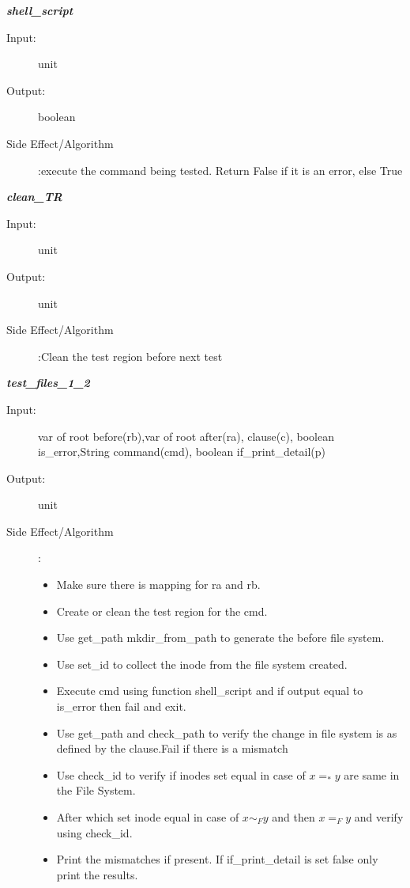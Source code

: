 \documentclass[12pt]{article}
\begin{document}
\begin{description}
\item \textbf{\textit{shell\_script}}
\begin{description}
    \item[Input:] unit
    \item[Output:] boolean
    \item[Side Effect/Algorithm]:execute the command being tested. Return False if it is an error, else True
\end{description}

\item \textbf{\textit{clean\_TR}}
\begin{description}
    \item[Input:] unit
    \item[Output:] unit
    \item[Side Effect/Algorithm]:Clean the test region before next test
\end{description}

\item \textbf{\textit{test\_files\_1\_2}}
\begin{description}
    \item[Input:] var of root before(rb),var of root after(ra), clause(c), boolean is\_error,String command(cmd), boolean if\_print\_detail(p)
    \item[Output:] unit
    \item[Side Effect/Algorithm]:
     \begin{itemize}
        \item Make sure there is mapping for ra and rb.
        \item Create or clean the test region for the cmd.
        \item Use get\_path mkdir\_from\_path to generate the before file system.
        \item Use set\_id to collect the inode from the file system created.
        \item Execute cmd using function shell\_script and if output equal to is\_error then fail and exit.
        \item Use get\_path and check\_path to verify the change in file system is as defined by the clause.Fail if there is a mismatch
        \item Use check\_id to verify if inodes set equal in case of $x=_*y$ are same in the File System.
        \item After which set inode equal in case of $x\sim_F y$ and then $x=_F y$ and verify using check\_id.
        \item Print the mismatches if present. If if\_print\_detail is set false only print the results.
    \end{itemize}
\end{description}    

\end{description} 
\end{document}
